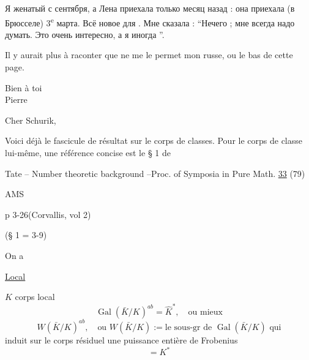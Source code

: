 
Я женатый с сентября, а Лена приехала только месяц назад : она приехала (в Брюсселе) 3\textsuperscript{e} марта. Всё новое для . Мне сказала : ``Нечего  ; мне всегда надо думать. Это очень интересно, а я иногда ''.

Il y aurait plus à raconter que ne me le permet mon russe, ou le bas de cette page.

\begin{center}
Bien à toi\\
\hfill Pierre
\end{center}


Cher Schurik,

Voici déjà le fascicule de résultat sur le corps de classes. Pour le corps de classe lui-même, une référence concise est le § 1 de

Tate -- Number theoretic background --\qquad Proc. of Symposia in Pure Math. \uline{33} (79)

\hfill AMS

p 3-26\hfill (Corvallis, vol 2)

\quad (§ 1 = 3-9)

On a

\uline{Local}

$K$ corps local
\[
\operatorname{Gal}(\bar K/K)^{ab}=\hat K^*,\quad\text{ou mieux}
\]
\[
W(\bar K/K)^{ab},\quad
\text{ou }W(\bar K/K):=\text{le sous-gr de }\operatorname{Gal}(\bar K/K)\text{ qui}
\]
induit sur le corps résiduel une puissance entière de Frobenius
\[
=K^*
\]


